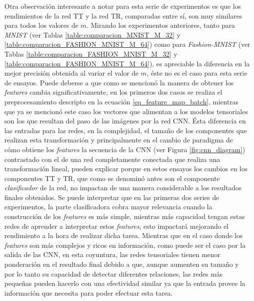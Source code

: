 \documentclass[spanish]{article}
\theoremstyle{definition}
\theoremstyle{remark}
\numberwithin{equation}{section}
\numberwithin{equation}{section} %
\begin{document}
Otra observación interesante a notar para esta serie de experimentos es que los rendimientos de la red TT y la red TR, comparadas entre sí, son muy similares para todos los valores de $m$. Mirando los experimentos anteriores, tanto para \textit{MNIST} (ver Tablas \ref{table:comparacion_MNIST_M_32} y \ref{table:comparacion_FASHION_MNIST_M_64}) como para \textit{Fashion-MNIST} (ver Tablas \ref{table:comparacion_FASHION_MNIST_M_32} y \ref{table:comparacion_FASHION_MNIST_M_64}), es apreciable la diferencia en la mejor precisión obtenida al variar el valor de $m$, éste no es el caso para esta serie de ensayos. Puede deberse a que como se mencionó la manera de obtener los \textit{features} cambia significativamente, en los primeros dos casos se realiza el preprocesamiento descripto en la ecuación \eqref{eq_feature_map_batch}, mientras que ya se mencionó este caso los vectores que alimentan a los modelos tensoriales son los que resultan del paso de las imágenes por la red CNN. Ésta diferencia en las entradas para las redes, en la complejidad, el tamaño de los componentes que realizan esta transformación y principalmente en el cambio de paradigma de cómo obtiene los \textit{features} la secuencia de la CNN (ver Figura \ref{fig:cnn_diagram}) contrastado con el de una red completamente conectada que realiza una transformación lineal, pueden explicar porque en estos ensayos los cambios en los componentes TT y TR, que como se denominó antes son el componente  \textit{clasificador} de la red, no impactan de una manera considerable a los resultados finales obtenidos. Se puede interpretar que en las primeras dos series de experimentos, la parte clasificadora cobra mayor relevancia cuando la construcción de los \textit{features} es más simple, mientras más capacidad tengan estas redes de aprender a interpretar estos \textit{features}, esto impactará mejorando el rendimiento a la hora de realizar dicha tarea. Mientras que en el caso donde los \textit{features} son más complejos y ricos en información, como puede ser el caso por la salida de las CNN, en esta coyuntura, las redes tensoriales tienen menor ponderación en el resultado final debido a que, aunque aumenten su tamaño y por lo tanto su capacidad de detectar diferentes relaciones, las redes más pequeñas pueden hacerlo con una efectividad similar ya que la entrada provee la información que necesita para poder efectuar esta tarea.
\par
\end{document}
